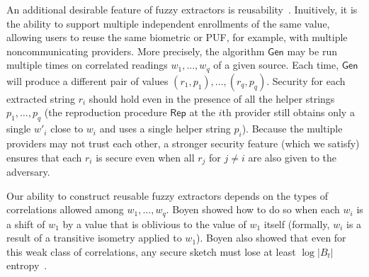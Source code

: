 \documentclass[11pt]{article}
\newcommand{\class}[1]{{\ensuremath{\mathsf{#1}}}}
\newcommand{\gen}{\ensuremath{\class{Gen}}\xspace}
\newcommand{\rep}{\ensuremath{\class{Rep}}\xspace}
\newcommand{\authnote}[2]{{\textcolor{red}{\textsf{#1 notes: }\textcolor{blue}{ #2}}\marginpar{\textcolor{red}{\textbf{!!!!!}}}}}
\newcommand{\authnote}[2]{}
\newcommand{\bnote}[1]{{\authnote{Ben}{#1}}}
\begin{document}
An additional desirable feature of fuzzy extractors is reusability~\cite{Boyen2004}. Inuitively, it is the ability to support multiple independent enrollments of the same value, allowing users to reuse the same biometric or PUF, for example, with multiple noncommunicating providers. More precisely, the algorithm $\gen$ may be run multiple times on correlated readings $w_1,..., w_q$ of a given source. Each time, $\gen$ will produce a different pair of values $(r_1, p_1),..., (r_q, p_q)$. Security for each extracted string $r_i$ should hold even in the presence of all the helper strings $p_1, \dots, p_q$ (the reproduction procedure $\rep$ at the $i$th provider still obtains only a single $w'_i$ close to $w_i$ and uses a single helper string $p_i$). Because the multiple providers may not trust each other, a stronger security feature (which we satisfy) ensures that each $r_i$ is secure even when all $r_j$ for $j\neq i$ are also given to the adversary.

 Our ability to construct reusable fuzzy extractors depends on the types of correlations allowed among $w_1, \dots, w_q$. Boyen \cite{Boyen2004} showed how to do so when each $w_i$ is a shift of $w_1$ by a value that is oblivious to the value of $w_1$ itself (formally, $w_i$ is a result of a transitive isometry applied to $w_1$). Boyen also showed that even for this weak class of correlations, any secure sketch must lose at least $\log |B_t|$ entropy~\cite[Theorem 11]{Boyen2004}.
  


%
\end{document}
